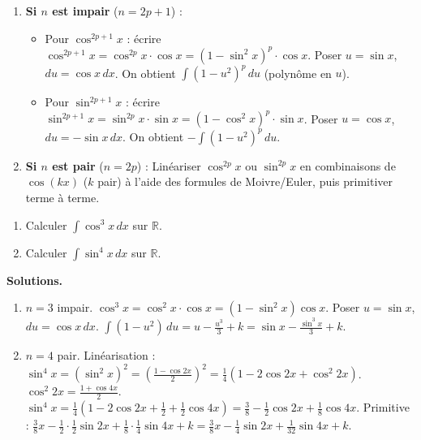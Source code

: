 \documentclass[11pt]{article}
\begin{document}
\begin{methode}
\begin{enumerate}
  \item \textbf{Si $n$ est impair} ($n=2p+1$) :
  \begin{itemize}
    \item Pour $\cos^{2p+1} x$ : écrire $\cos^{2p+1} x = \cos^{2p} x \cdot \cos x = (1-\sin^2 x)^p \cdot \cos x$.
    Poser $u = \sin x$, $du = \cos x\,dx$. On obtient $\int (1-u^2)^p\,du$ (polynôme en $u$).
    \item Pour $\sin^{2p+1} x$ : écrire $\sin^{2p+1} x = \sin^{2p} x \cdot \sin x = (1-\cos^2 x)^p \cdot \sin x$.
    Poser $u = \cos x$, $du = -\sin x\,dx$. On obtient $-\int (1-u^2)^p\,du$.
  \end{itemize}
  \item \textbf{Si $n$ est pair} ($n=2p$) :
  Linéariser $\cos^{2p} x$ ou $\sin^{2p} x$ en combinaisons de $\cos(kx)$ ($k$ pair) à l'aide des formules de Moivre/Euler, puis primitiver terme à terme.
\end{enumerate}
\end{methode}

\begin{exoresolu}
\begin{enumerate}
  \item Calculer $\int \cos^3 x\,dx$ sur $\mathbb{R}$.
  \item Calculer $\int \sin^4 x\,dx$ sur $\mathbb{R}$.
\end{enumerate}
\tcblower
\textbf{Solutions.}
\begin{enumerate}
  \item $n=3$ impair. $\cos^3 x = \cos^2 x \cdot \cos x = (1-\sin^2 x)\cos x$.
  Poser $u=\sin x$, $du=\cos x\,dx$.
  $\int (1-u^2)\,du = u - \frac{u^3}{3} + k = \sin x - \frac{\sin^3 x}{3} + k$.
  \item $n=4$ pair. Linéarisation :
  $\sin^4 x = (\sin^2 x)^2 = \left(\frac{1-\cos 2x}{2}\right)^2 = \frac{1}{4}(1 - 2\cos 2x + \cos^2 2x)$.
  $\cos^2 2x = \frac{1+\cos 4x}{2}$.
  $\sin^4 x = \frac{1}{4}\left(1 - 2\cos 2x + \frac{1}{2} + \frac{1}{2}\cos 4x\right) = \frac{3}{8} - \frac{1}{2}\cos 2x + \frac{1}{8}\cos 4x$.
  Primitive : $\frac{3}{8}x - \frac{1}{2}\cdot\frac{1}{2}\sin 2x + \frac{1}{8}\cdot\frac{1}{4}\sin 4x + k = \frac{3}{8}x - \frac{1}{4}\sin 2x + \frac{1}{32}\sin 4x + k$.
\end{enumerate}
\end{exoresolu}
\end{document}
